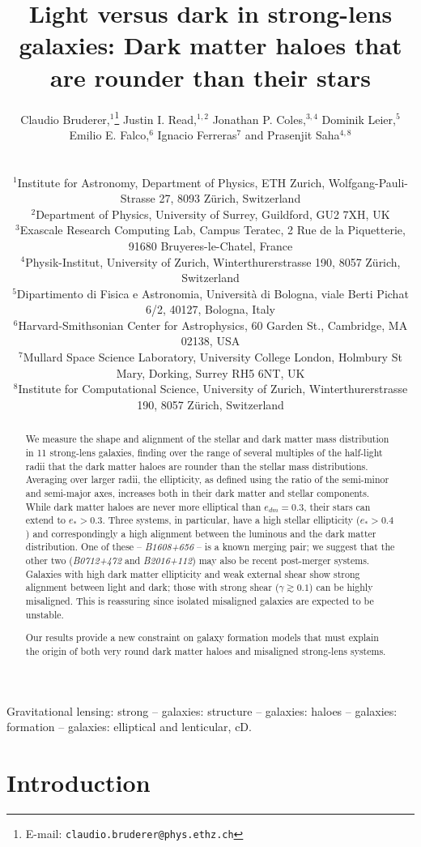 \documentclass[useAMS,usenatbib]{mn2e}
\title[Light versus dark in strong-lens galaxies]{Light versus dark in strong-lens galaxies: Dark matter haloes that are rounder than their stars}
\author[Bruderer et al.]
{\parbox{\textwidth}{Claudio Bruderer,$^{1}$\thanks{E-mail: \texttt{claudio.bruderer@phys.ethz.ch}}
Justin I. Read,$^{1,2}$
Jonathan P. Coles,$^{3,4}$
Dominik Leier,$^{5}$
Emilio E. Falco,$^{6}$
Ignacio Ferreras$^{7}$ and
Prasenjit Saha$^{4,8}$}\vspace{0.4cm}\\
\parbox{\textwidth}{$^{1}$Institute for Astronomy, Department of Physics, ETH Zurich, Wolfgang-Pauli-Strasse 27, 8093 Z\"urich, Switzerland\\
$^{2}$Department of Physics, University of Surrey, Guildford, GU2 7XH, UK\\
$^{3}$Exascale Research Computing Lab, Campus Teratec, 2 Rue de la Piquetterie, 91680 Bruyeres-le-Chatel, France\\
$^{4}$Physik-Institut, University of Zurich, Winterthurerstrasse 190, 8057 Z\"urich, Switzerland\\
$^{5}$Dipartimento di Fisica e Astronomia, Universit\`{a} di Bologna, viale Berti Pichat 6/2, 40127, Bologna, Italy\\
$^{6}$Harvard-Smithsonian Center for Astrophysics, 60 Garden St., Cambridge, MA 02138, USA\\
$^{7}$Mullard Space Science Laboratory, University College London, Holmbury St Mary, Dorking, Surrey RH5 6NT, UK\\
$^{8}$Institute for Computational Science, University of Zurich, Winterthurerstrasse 190, 8057 Z\"urich, Switzerland}}
\begin{document}
\maketitle

\begin{abstract}
We measure the shape and alignment of the stellar and dark matter mass distribution in 11 strong-lens galaxies, finding over the range of several multiples of the half-light radii that the dark matter haloes are rounder than the stellar mass distributions. Averaging over larger radii, the ellipticity, as defined using the ratio of the semi-minor and semi-major axes, increases both in their dark matter and stellar components. While dark matter haloes are never more elliptical than $e_{dm} = 0.3$, their stars can extend to $e_* > 0.3$. Three systems, in particular, have a high stellar ellipticity ($e_* > 0.4$) and correspondingly a high alignment between the luminous and the dark matter distribution. One of these -- {\it B1608+656} -- is a known merging pair; we suggest that the other two ({\it B0712+472} and {\it B2016+112}) may also be recent post-merger systems. Galaxies with high dark matter ellipticity and weak external shear show strong alignment between light and dark; those with strong shear ($\gamma \gtrsim 0.1$) can be highly misaligned. This is reassuring since isolated misaligned galaxies are expected to be unstable.

Our results provide a new constraint on galaxy formation models that must explain the origin of both very round dark matter haloes and misaligned strong-lens systems.

\end{abstract}

\begin{keywords}
Gravitational lensing: strong -- galaxies: structure -- galaxies: haloes -- galaxies: formation -- galaxies: elliptical and lenticular, cD.
\end{keywords}


\section{Introduction}\label{sec:introduction}
\end{document}
